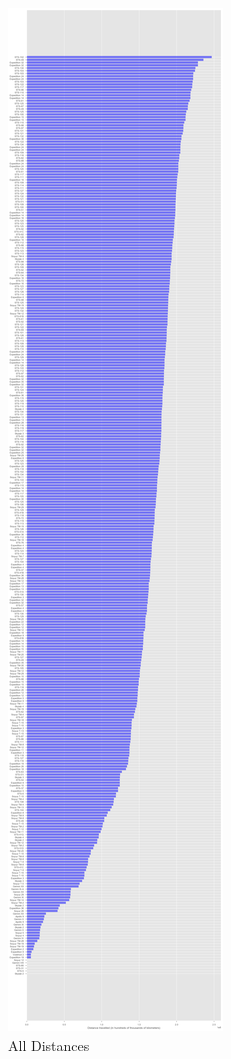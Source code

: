 \documentclass[sigconf]{acmart}
\begin{document}
\begin{figure}[!ht]
  \centering\includegraphics[width=\columnwidth]{images/fig1.png}
  \caption{All Distances}\label{f:fig1}
\end{figure}
\end{document}
